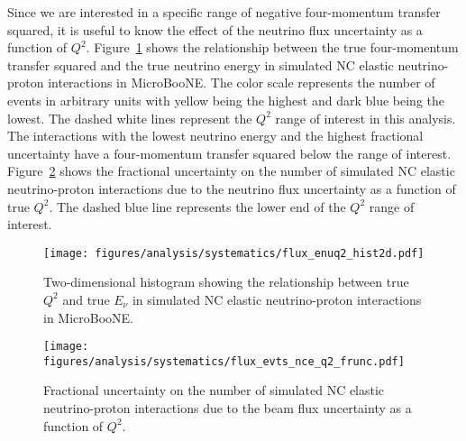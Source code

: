     Since we are interested in a specific range of negative four-momentum
    transfer squared, it is useful to know the effect of the neutrino flux
    uncertainty as a function of $Q^2$. Figure~\ref{fig:qevenu} shows the
    relationship between the true four-momentum transfer squared and the true
    neutrino energy in simulated NC elastic neutrino-proton interactions in
    MicroBooNE. The color scale represents the number of events in arbitrary
    units with yellow being the highest and dark blue being the lowest. The
    dashed white lines represent the $Q^2$ range of interest in this analysis.
    The interactions with the lowest neutrino energy and the highest fractional
    uncertainty have a four-momentum transfer squared below the range of
    interest. Figure~\ref{fig:q2frac} shows the fractional uncertainty on the
    number of simulated NC elastic neutrino-proton interactions due to the
    neutrino flux uncertainty as a function of true $Q^2$. The dashed blue line
    represents the lower end of the $Q^2$ range of interest.
    \begin{figure}[ht]
      \centering
      \texttt{[image: figures/analysis/systematics/flux\_enuq2\_hist2d.pdf]}
      \caption{Two-dimensional histogram showing the relationship between true
      $Q^2$ and true $E_{\nu}$ in simulated NC elastic neutrino-proton
      interactions in MicroBooNE.}
      \label{fig:qevenu}
    \end{figure}
    \begin{figure}[ht]
      \centering
      \texttt{[image: figures/analysis/systematics/flux\_evts\_nce\_q2\_frunc.pdf]}
      \caption{Fractional uncertainty on the number of simulated NC elastic
      neutrino-proton interactions due to the beam flux uncertainty as a
      function of $Q^2$.}
      \label{fig:q2frac}
    \end{figure}

